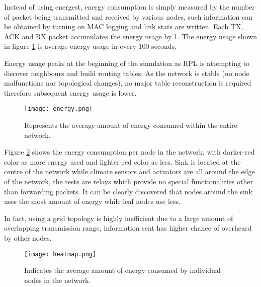 \documentclass[12pt, oneside, a4paper]{article}
\begin{document}
    Instead of using energest, energy consumption is simply measured by the number of packet being transmitted and received by various nodes, such information can be obtained by turning on MAC logging and link stats are written. Each TX, ACK and RX packet accumulates the energy usage by 1. The energy usage shown in figure \ref{energy} is average energy usage in every 100 seconds.

    Energy usage peaks at the beginning of the simulation as RPL is attempting to discover neighbours and build routing tables. As the network is stable (no node malfunctions nor topological changes), no major table reconstruction is required therefore subsequent energy usage is lower. 

    \begin{figure}[H]
        \centering
        \texttt{[image: energy.png]}
        \caption{Represents the average amount of energy consumed within the entire network.}
        \label{energy}
    \end{figure}

    Figure \ref{heatmap} shows the energy consumption per node in the network, with darker-red color as more energy used and lighter-red color as less. Sink is located at the centre of the network while climate sensors and actuators are all around the edge of the network, the rests are relays which provide no special functionalities other than forwarding packets. It can be clearly discovered that nodes around the sink uses the most amount of energy while leaf nodes use less.

    In fact, using a grid topology is highly inefficient due to a large amount of overlapping transmission range, information sent has higher chance of overheard by other nodes.

    \begin{figure}[H]
        \centering
        \texttt{[image: heatmap.png]}
        \caption{Indicates the average amount of energy consumed by individual nodes in the network.}
        \label{heatmap}
    \end{figure}
\end{document}
